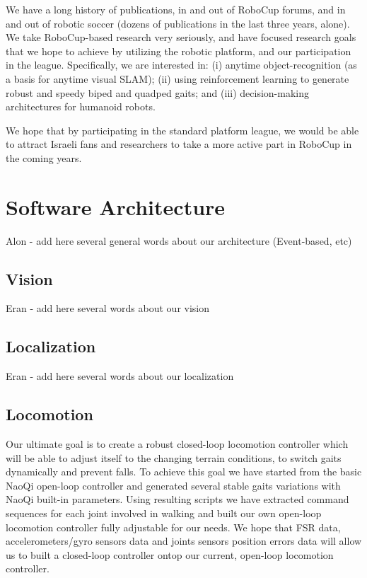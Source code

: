 \documentclass[runningheads,a4paper]{llncs}
\begin{document}
We have a long history of publications, in and out of RoboCup forums, and in
and out of robotic soccer (dozens of publications in the last three years, alone). We
take RoboCup-based research very seriously, and have focused research goals that we
hope to achieve by utilizing the robotic platform, and our participation in the league.
Specifically, we are interested in: (i) anytime object-recognition (as a basis for anytime
visual SLAM); (ii) using reinforcement learning to generate robust and speedy biped
and quadped gaits; and (iii) decision-making architectures for humanoid robots.

We hope that by participating in the standard platform league, we would be able to attract Israeli fans and researchers to take a more active part in RoboCup in the coming years.



\section{Software Architecture}
Alon - add here several general words about our architecture (Event-based, etc)

\subsection{Vision}
Eran - add here several words about our vision

\subsection{Localization}
Eran - add here several words about our localization

\subsection{Locomotion}
Our ultimate goal is to create a robust closed-loop locomotion controller which will be able to adjust itself to the changing terrain conditions, to switch gaits dynamically and prevent falls. To achieve this goal we have started from the basic NaoQi open-loop controller and generated several stable gaits variations with NaoQi built-in parameters. Using resulting scripts we have extracted command sequences for each joint involved in walking and built our own open-loop locomotion controller fully adjustable for our needs. We hope that FSR data, accelerometers/gyro sensors data and joints sensors position errors data will allow us to built a closed-loop controller ontop our current, open-loop locomotion controller.
\end{document}
